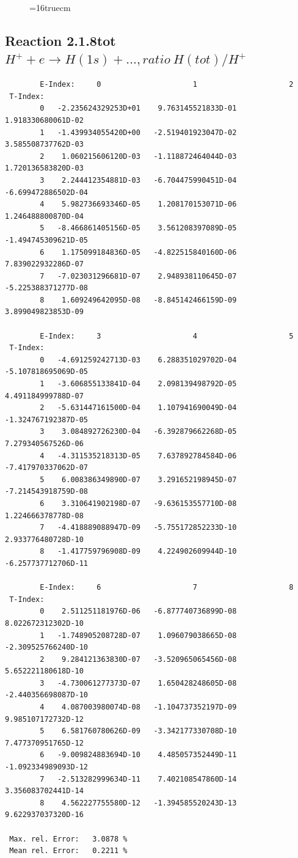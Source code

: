 \documentclass[12pt,dvips]{article}
\begin{document}
\begin{figure} \label{2.1.8re}
\epsfxsize=16truecm
\end{figure}
\newpage


\subsection{
Reaction 2.1.8tot  $H^+ + e \rightarrow H(1s) + ..., ratio ~H(tot)/H^+$
}

\begin{small}\begin{verbatim}
        E-Index:     0                     1                     2
 T-Index:
        0   -2.235624329253D+01    9.763145521833D-01    1.918330680061D-02
        1   -1.439934055420D+00   -2.519401923047D-02    3.585508737762D-03
        2    1.060215606120D-03   -1.118872464044D-03    1.720136583820D-03
        3    2.244412354881D-03   -6.704475990451D-04   -6.699472886502D-04
        4    5.982736693346D-05    1.208170153071D-06    1.246488800870D-04
        5   -8.466861405156D-05    3.561208397089D-05   -1.494745309621D-05
        6    1.175099184836D-05   -4.822515840160D-06    7.839022932286D-07
        7   -7.023031296681D-07    2.948938110645D-07   -5.225388371277D-08
        8    1.609249642095D-08   -8.845142466159D-09    3.899049823853D-09

        E-Index:     3                     4                     5
 T-Index:
        0   -4.691259242713D-03    6.288351029702D-04   -5.107818695069D-05
        1   -3.606855133841D-04    2.098139498792D-05    4.491184999788D-07
        2   -5.631447161500D-04    1.107941690049D-04   -1.324767192387D-05
        3    3.084892726230D-04   -6.392879662268D-05    7.279340567526D-06
        4   -4.311535218313D-05    7.637892784584D-06   -7.417970337062D-07
        5    6.008386349890D-07    3.291652198945D-07   -7.214543918759D-08
        6    3.310641902198D-07   -9.636153557710D-08    1.224666378778D-08
        7   -4.418889088947D-09   -5.755172852233D-10    2.933776480728D-10
        8   -1.417759796908D-09    4.224902609944D-10   -6.257737712706D-11

        E-Index:     6                     7                     8
 T-Index:
        0    2.511251181976D-06   -6.877740736899D-08    8.022672312302D-10
        1   -1.748905208728D-07    1.096079038665D-08   -2.309525766240D-10
        2    9.284121363830D-07   -3.520965065456D-08    5.652221180618D-10
        3   -4.730061277373D-07    1.650428248605D-08   -2.440356698087D-10
        4    4.087003980074D-08   -1.104737352197D-09    9.985107172732D-12
        5    6.581760780626D-09   -3.342177330708D-10    7.477370951765D-12
        6   -9.009824883694D-10    4.485057352449D-11   -1.092334989093D-12
        7   -2.513282999634D-11    7.402108547860D-14    3.356083702441D-14
        8    4.562227755580D-12   -1.394585520243D-13    9.622937037320D-16

 Max. rel. Error:   3.0878 %
 Mean rel. Error:   0.2211 %

\end{verbatim}\end{small}
\end{document}
